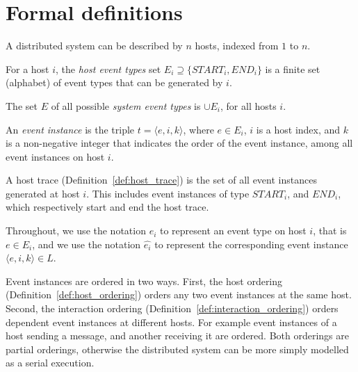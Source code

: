 \appendix 

\section{Formal definitions}
\label{sec:formal-appendix}

A distributed system can be described by $n$ hosts, indexed
from $1$ to $n$.

\begin{definition} \label{def:host_event_type} For
a host $i$, the \textit{host event types} set $E_i \supseteq
\{START_i, END_i\}$ is a finite set (alphabet) of event types that can
be generated by $i$.  \end{definition}

\begin{definition} \label{def:syste_event_type}
The set $E$ of all possible \textit{system event types} is $\cup E_i$,
for all hosts $i$.  \end{definition}

\begin{definition} \label{def:event_instance} An
    \textit{event instance} is the triple $t = \langle e,i,k \rangle$,
    where $e \in E_i$, $i$ is a host index, and $k$ is a non-negative
    integer that indicates the order of the event instance, among all
event instances on host $i$.  \end{definition}

A host trace (Definition~\ref{def:host_trace}) is the set of all event
instances generated at host $i$. This includes event instances of type
$START_i$, and $END_i$, which respectively start and end the host
trace.

Throughout, we use the notation $e_i$ to represent an event type on
host $i$, that is $e \in E_i$, and we use the notation $\hat{e_i}$ to
represent the corresponding event instance $\langle e,i,k \rangle \in
L$.

Event instances are ordered in two ways. First, the host ordering
(Definition~\ref{def:host_ordering}) orders any two event instances at
the same host. Second, the interaction ordering
(Definition~\ref{def:interaction_ordering}) orders dependent event
instances at different hosts. For example event instances of a host
sending a message, and another receiving it are ordered. Both
orderings are partial orderings, otherwise the distributed system can
be more simply modelled as a serial execution.

